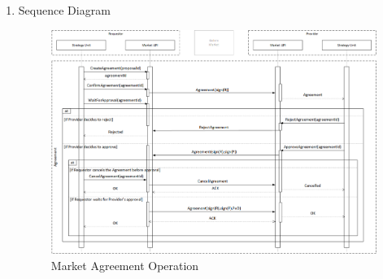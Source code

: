 \begin{enumerate}
\begin{enumerate}
\begin{itemize}
\item AgreementCancelledEvent : indicates that the Applicant has called cancelAgreement, which effectively stops the Agreement negotiation.

\item AgreementTerminatedEvent : indicates that the Agreement has been terminated by the specified party (includes a signature).

\end{itemize}

The ListAgreements method is used to retrieve information about agreements. It uses optional filters:

\begin{itemize}

\item state: [Proposal, Pending, Cancelled, Rejected, Approved, Expired, Terminated ]

\item creation date and time

\item application session identifier

\end{itemize}

The GetAgreementContent() function is used to retrieve an agreement (Agreement object) based on a given identifier (agreementId).

The ValidateAgreementContent() function is used to verify an agreement (Agreement object) sent as a byte stream.

(Please see Figure ~\ref{fig:MAO} on page ~\pageref{fig:MAO}).

\item Sequence Diagram

\begin{figure}[H]
    \centering
    \includegraphics[width=14cm,angle=0]{./diag/Sequence/MarketAgreement-B-Sequence.png}
	\caption{Market Agreement Operation}
    \label{fig:MAO}
\end{figure}


\end{enumerate}
\end{enumerate}

